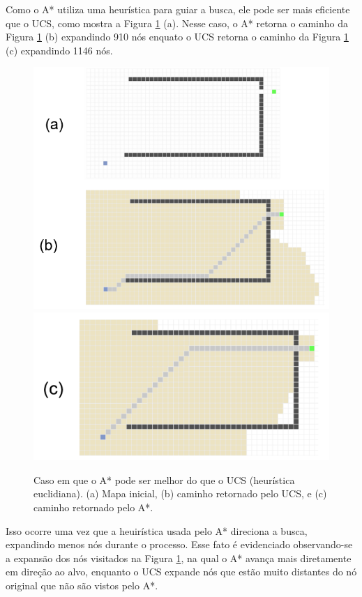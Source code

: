\documentclass[letterpaper]{article} %
\begin{document}
Como o A* utiliza uma heurística para guiar a busca, ele pode ser mais eficiente
que o UCS, como mostra a Figura \ref{fig:astar_melhor_ucs} (a). Nesse caso, o A*
retorna o caminho da Figura \ref{fig:astar_melhor_ucs} (b) expandindo 910 nós enquato o 
 UCS retorna o caminho da Figura \ref{fig:astar_melhor_ucs} (c) expandindo 1146 nós.
\begin{figure}[htb]
	\centering 
    \caption{Caso em que o A* pode ser melhor do que o UCS (heurística euclidiana). (a) Mapa inicial, 
	(b) caminho retornado pelo UCS, e (c)
	caminho retornado pelo A*.}
	\includegraphics[width=\columnwidth]{images/astar_melhor_ucs_p1.png}
	\includegraphics[width=\columnwidth]{images/astar_melhor_ucs_p2.png}
	\label{fig:astar_melhor_ucs}
\end{figure}

Isso ocorre uma vez que a heuirística usada pelo A* direciona a busca, expandindo menos nós durante o processo.
Esse fato é evidenciado observando-se a expansão dos nós visitados na Figura \ref{fig:astar_melhor_ucs}, 
na qual o A* avança mais diretamente em direção ao alvo, enquanto o UCS expande nós que estão muito distantes 
do nó original que não são vistos pelo A*.
\end{document}
